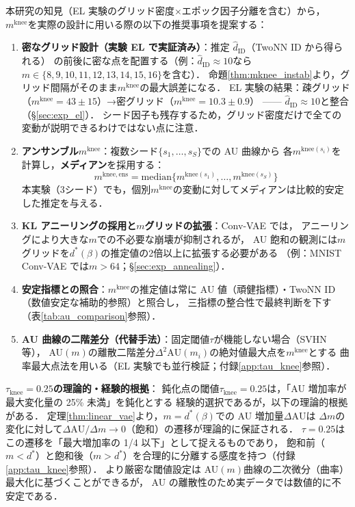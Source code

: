\documentclass[11pt,a4paper]{jsarticle}
\newcommand{\mknee}{m^{\mathrm{knee}}}
\begin{document}
本研究の知見（EL 実験のグリッド密度×エポック因子分離を含む）から，
$\mknee$を実際の設計に用いる際の以下の推奨事項を提案する：
\begin{enumerate}
  \item \textbf{密なグリッド設計（実験 EL で実証済み）}：推定 $\hat{d}_\mathrm{ID}$（TwoNN ID から得られる）
        の前後に密な点を配置する（例：$\hat{d}_\mathrm{ID} \approx 10$なら$m \in \{8,9,10,11,12,13,14,15,16\}$を含む）．
        命題\ref{thm:mknee_instab}より，グリッド間隔がそのまま$\mknee$の最大誤差になる．
        EL 実験の結果：疎グリッド（$\mknee=43\pm15$）→密グリッド（$\mknee=10.3\pm0.9$）
        —— $\hat{d}_\mathrm{ID} \approx 10$と整合（§\ref{sec:exp_el}）．
        シード因子も残存するため，グリッド密度だけで全ての変動が説明できるわけではない点に注意．
  \item \textbf{アンサンブル$\mknee$}：複数シード$\{s_1,\ldots,s_S\}$での AU 曲線から
        各$m^{\mathrm{knee}(s_i)}$を計算し，\textbf{メディアン}を採用する：
        \begin{equation}
          m^{\mathrm{knee,ens}} = \mathrm{median}\bigl\{m^{\mathrm{knee}(s_1)}, \ldots, m^{\mathrm{knee}(s_S)}\bigr\}
          \label{eq:mknee_ens}
        \end{equation}
        本実験（3シード）でも，個別$\mknee$の変動に対してメディアンは比較的安定した推定を与える．
  \item \textbf{KL アニーリングの採用と$m$グリッドの拡張}：Conv-VAE では，
        アニーリングにより大きな$m$での不必要な崩壊が抑制されるが，
        AU 飽和の観測には$m$グリッドを$d^*(\beta)$の推定値の2倍以上に拡張する必要がある
        （例：MNIST Conv-VAE では$m > 64$；§\ref{sec:exp_annealing}）．
  \item \textbf{安定指標との照合}：$\mknee$の推定値は常に AU 値（頑健指標）・TwoNN ID（数値安定な補助的参照）と照合し，
        三指標の整合性で最終判断を下す（表\ref{tab:au_comparison}参照）．
  \item \textbf{AU 曲線の二階差分（代替手法）}：固定閾値$\tau$が機能しない場合（SVHN 等），
        AU$(m)$の離散二階差分$\Delta^2\mathrm{AU}(m_i)$の絶対値最大点を$\mknee$とする
        曲率最大点法を用いる（EL 実験でも並行検証；付録\ref{app:tau_knee}参照）．
\end{enumerate}

\textbf{$\tau_{\mathrm{knee}} = 0.25$の理論的・経験的根拠}：
鈍化点の閾値$\tau_{\mathrm{knee}} = 0.25$は，「AU 増加率が最大変化量の 25\% 未満」を鈍化とする
経験的選択であるが，以下の理論的根拠がある．
定理\ref{thm:linear_vae}より，$m = d^*(\beta)$での AU 増加量$\Delta\mathrm{AU}$は
$\Delta m$の変化に対して$\Delta\mathrm{AU}/\Delta m \to 0$（飽和）の遷移が理論的に保証される．
$\tau = 0.25$はこの遷移を「最大増加率の 1/4 以下」として捉えるものであり，
飽和前（$m < d^*$）と飽和後（$m > d^*$）を合理的に分離する感度を持つ（付録\ref{app:tau_knee}参照）．
より厳密な閾値設定は AU$(m)$曲線の二次微分（曲率）最大化に基づくことができるが，
AU の離散性のため実データでは数値的に不安定である．
\end{document}
